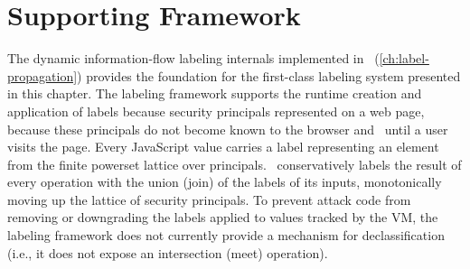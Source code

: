 \section{Supporting Framework}
\label{sec:supporting-framework}

The dynamic information-flow labeling internals implemented in \JitFlow\ (\autoref{ch:label-propagation}) provides the foundation for the first-class labeling system presented in this chapter.
The labeling framework supports the runtime creation and application of labels because security principals represented on a web page, because these principals do not become known to the browser and \JitFlow\ until a user visits the page.
Every JavaScript value carries a label representing an element from the finite powerset lattice over principals.
\JitFlow\ conservatively labels the result of every operation with the union (join) of the labels of its inputs, monotonically moving up the lattice of security principals.
To prevent attack code from removing or downgrading the labels applied to values tracked by the VM, the labeling framework does not currently provide a mechanism for declassification (i.e., it does not expose an intersection (meet) operation).


